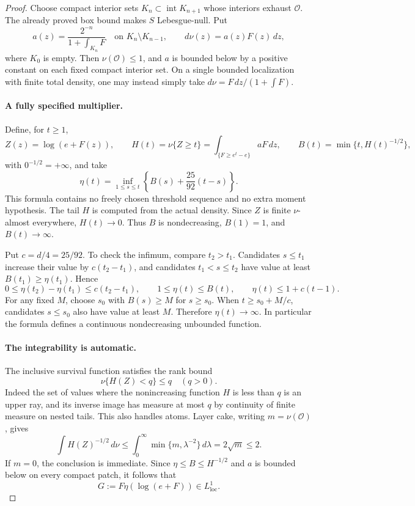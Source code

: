 \documentclass[11pt]{article}
\begin{document}
\begin{proof}
Choose compact interior sets $K_n\subset\operatorname{int}K_{n+1}$ whose interiors exhaust $\mathcal O$. The already proved box bound makes $S$ Lebesgue-null. Put
$$
a(z)=\frac{2^{-n}}{1+\int_{K_n}F}
\quad\text{on }K_n\setminus K_{n-1},\qquad
d\nu(z)=a(z)F(z)\,dz,
$$
where $K_0$ is empty. Then $\nu(\mathcal O)\le1$, and $a$ is bounded below by a positive constant on each fixed compact interior set. On a single bounded localization with finite total density, one may instead simply take $d\nu=F\,dz/(1+\int F)$.

\paragraph{A fully specified multiplier.}
Define, for $t\ge1$,
$$
Z(z)=\log(e+F(z)),\qquad
H(t)=\nu\{Z\ge t\}
=\int_{\{F\ge e^t-e\}}aF\,dz,
\qquad
B(t)=\min\{t,H(t)^{-1/2}\},
$$
with $0^{-1/2}=+\infty$, and take
$$
\boxed{\displaystyle
\eta(t)=\inf_{1\le s\le t}
\left\{B(s)+\frac{25}{92}(t-s)\right\}.}
$$
This formula contains no freely chosen threshold sequence and no extra moment hypothesis. The tail $H$ is computed from the actual density. Since $Z$ is finite $\nu$-almost everywhere, $H(t)\to0$. Thus $B$ is nondecreasing, $B(1)=1$, and $B(t)\to\infty$.

Put $c=d/4=25/92$. To check the infimum, compare $t_2>t_1$. Candidates $s\le t_1$ increase their value by $c(t_2-t_1)$, and candidates $t_1<s\le t_2$ have value at least $B(t_1)\ge\eta(t_1)$. Hence
$$
0\le\eta(t_2)-\eta(t_1)\le c(t_2-t_1),
\qquad 1\le\eta(t)\le B(t),
\qquad \eta(t)\le1+c(t-1).
$$
For any fixed $M$, choose $s_0$ with $B(s)\ge M$ for $s\ge s_0$. When $t\ge s_0+M/c$, candidates $s\le s_0$ also have value at least $M$. Therefore $\eta(t)\to\infty$. In particular the formula defines a continuous nondecreasing unbounded function.

\paragraph{The integrability is automatic.}
The inclusive survival function satisfies the rank bound
$$
\nu\{H(Z)<q\}\le q\quad(q>0).
$$
Indeed the set of values where the nonincreasing function $H$ is less than $q$ is an upper ray, and its inverse image has measure at most $q$ by continuity of finite measure on nested tails. This also handles atoms. Layer cake, writing $m=\nu(\mathcal O)$, gives
$$
\int H(Z)^{-1/2}\,d\nu
\le\int_0^\infty\min\{m,\lambda^{-2}\}\,d\lambda
=2\sqrt m\le2.
$$
If $m=0$, the conclusion is immediate. Since $\eta\le B\le H^{-1/2}$ and $a$ is bounded below on every compact patch, it follows that
$$
G:=F\eta(\log(e+F))\in L^1_{\mathrm{loc}}.
$$


\end{proof}
\end{document}
